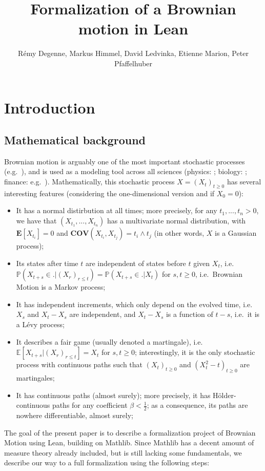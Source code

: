 \documentclass[lean]{DraftAFM}
\title[Formalization of a Brownian motion in Lean]{Formalization of a Brownian motion in Lean}
\author[R. Degenne, M. Himmel, D. Ledvinka, E. Marion, P. Pfaffelhuber]{
  Rémy Degenne, Markus Himmel, David Ledvinka, Etienne Marion, Peter Pfaffelhuber}
\begin{document}
\section{Introduction}

\subsection{Mathematical background}
Brownian motion is arguably one of the most important stochastic processes (e.g.\ \citealp{karatzas1991brownian, morters2010brownian}), and is used as a modeling tool across all sciences (physics: ; biology: ; finance: e.g.\ \citealp{bachelier2011louis}). Mathematically, this stochastic process $X = (X_t)_{t\geq 0}$ has several interesting features (considering the one-dimensional version and if $X_0=0$):
\begin{itemize}
\item It has a normal distirbution at all times; more precisely, for any $t_1,...,t_n > 0$, we have that $(X_{t_1},...,X_{t_n})$ has a multivariate normal distribution, with $\mathbf E[X_{t_i}] = 0$ and $\mathbf{COV}(X_{t_i}, X_{t_j}) = t_i \wedge t_j$ (in other words, $X$ is a Gaussian process);
\item Its states after time $t$ are independent of states before $t$ given $X_t$, i.e.\ $\mathbb P(X_{t+s} \in . | (X_r)_{r\leq t}) = \mathbb P(X_{t+s} \in . | X_t)$ for $s,t \ge 0$, i.e.\ Brownian Motion is a Markov process;
\item It has independent increments, which only depend on the evolved time, i.e.\ $X_s$ and $X_t - X_s$ are independent, and $X_t - X_s$ is a function of $t-s$, i.e.\ it is a Lévy process;
\item It describes a fair game (usually denoted a martingale), i.e.\ $\mathbb E[X_{t+s} | (X_r)_{r\leq t}] = X_t$ for $s,t \geq 0$; interestingly, it is the only stochastic process with continuous paths such that $(X_t)_{t\geq 0}$ and $(X_t^2 - t)_{t\geq 0}$ are martingales;
\item It has continuous paths (almost surely); more precisely, it has Hölder-continuous paths for any coefficient $\beta < \tfrac 12$; as a consequence, its paths are nowhere differentiable, almost surely;
\end{itemize}
The goal of the present paper is to describe a formalization project of Brownian Motion using Lean, building on Mathlib. Since Mathlib has a decent amount of measure theory already included, but is still lacking some fundamentals, we describe our way to a full formalization using the following steps:
\end{document}
